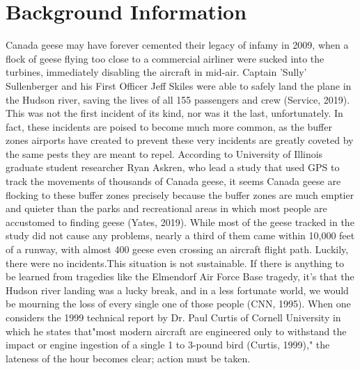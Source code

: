 \section{Background Information}
Canada geese may have forever cemented their legacy of infamy in 2009,  when a flock of geese flying  too  close  to  a  commercial  airliner  were sucked  into  the  turbines,  immediately  disabling the  aircraft  in  mid-air. Captain  ’Sully’  Sullenberger and his First Officer Jeff Skiles were able to safely land the plane in the Hudson river, saving the lives of all 155 passengers and crew (Service, 2019).  This  was  not  the  first  incident  of  its  kind, nor  was  it  the  last,  unfortunately.   In  fact,  these incidents are poised to become much more common,  as the buffer zones airports have created to prevent these very incidents are greatly coveted by the same pests they are meant to repel. According to University of Illinois graduate student researcher Ryan Askren, who lead a study that used GPS to track the movements of thousands of Canada geese, it seems Canada geese are flocking to these buffer zones precisely because the buffer zones are much emptier and quieter than the parks and recreational areas in which most people are accustomed  to  finding  geese  (Yates,  2019).   While most  of  the  geese tracked in the study  did  not  cause  any  problems, nearly a third of them came within 10,000 feet of a runway, with almost 400 geese even crossing an aircraft flight  path.  Luckily, there were no incidents.This situation is not sustainable. If there is anything to be learned from tragedies like the Elmendorf Air Force Base tragedy, it’s that the Hudson river landing was a lucky break, and in a less fortunate world, we would be mourning the loss of every single one of those people (CNN, 1995). When one considers the 1999 technical report by Dr. Paul Curtis of Cornell University in which he states that"most modern aircraft are engineered only to withstand the impact or engine ingestion of a single 1 to 3-pound bird (Curtis, 1999)," the lateness of the hour becomes clear; action must be taken.